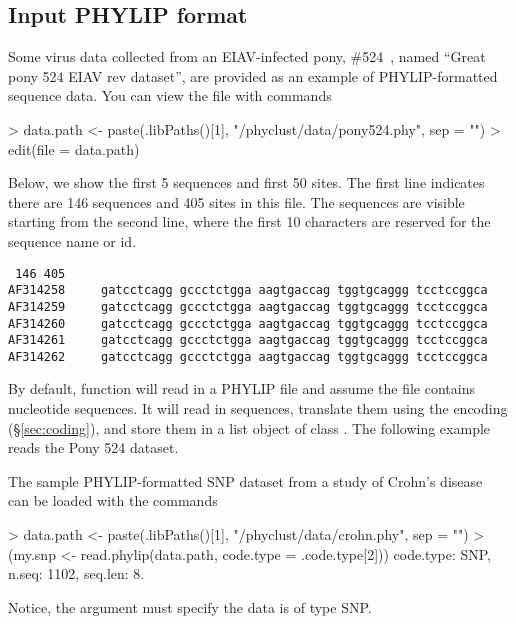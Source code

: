 \subsection[PHYLIP format]{Input PHYLIP format}
\label{sec:phylip}

Some virus data collected from an EIAV-infected pony, \#524~\citep{Baccam2003},
named ``Great pony 524 EIAV rev dataset'',
are provided as an example of PHYLIP-formatted sequence data.
You can view the file with commands
\begin{Code}
> data.path <- paste(.libPaths()[1], "/phyclust/data/pony524.phy", sep = "")
> edit(file = data.path)
\end{Code}
Below, we show the first 5 sequences and first 50 sites. The first line
indicates there are 146 sequences and 405 sites in this file. The sequences
are visible starting from the second line, where the first 10 characters are reserved for
the sequence name or id.
\begin{verbatim}
 146 405
AF314258     gatcctcagg gccctctgga aagtgaccag tggtgcaggg tcctccggca
AF314259     gatcctcagg gccctctgga aagtgaccag tggtgcaggg tcctccggca
AF314260     gatcctcagg gccctctgga aagtgaccag tggtgcaggg tcctccggca
AF314261     gatcctcagg gccctctgga aagtgaccag tggtgcaggg tcctccggca
AF314262     gatcctcagg gccctctgga aagtgaccag tggtgcaggg tcctccggca
\end{verbatim}

By default, function  will read in a PHYLIP file and
assume the file contains nucleotide sequences. It will read in sequences,
translate them using the encoding (\S\ref{sec:coding}), and
store them in a list object of class .
The following example reads the Pony 524 dataset.

The sample PHYLIP-formatted SNP dataset from a study of Crohn's disease~\citep{Hugot2001} can be loaded with the commands
\begin{Code}
> data.path <- paste(.libPaths()[1], "/phyclust/data/crohn.phy", sep = "")
> (my.snp <- read.phylip(data.path, code.type = .code.type[2]))
code.type: SNP, n.seq: 1102, seq.len: 8.
\end{Code}
Notice, the  argument must specify the data is of type SNP.




